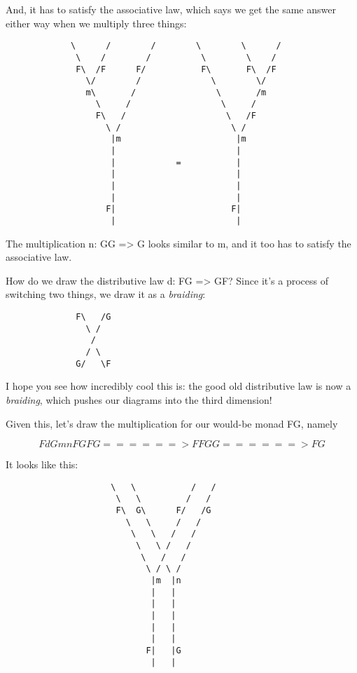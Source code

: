 And, it has to satisfy the associative law, which says we
get the same answer either way when we multiply three things:

\begin{verbatim}
             \      /        /        \        \      /
              \    /        /          \        \    /
              F\  /F      F/           F\       F\  /F
                \/        /              \        \/
                m\       /                \       /m 
                  \     /                  \     /
                  F\   /                    \   /F
                    \ /                      \ /
                     |m                       |m
                     |                        |
                     |            =           |
                     |                        |
                     |                        |
                     |                        |
                    F|                       F|
                     |                        |
\end{verbatim}
    
The multiplication n: GG => G looks similar to m, and it too has
to satisfy the associative law.   

How do we draw the distributive law d: FG => GF?  Since it's a 
process of switching two things, we draw it as a \emph{braiding}:

\begin{verbatim}
              F\   /G
                \ /
                 / 
                / \
              G/   \F 
\end{verbatim}
    
I hope you see how incredibly cool this is: the good old 
distributive law is now a \emph{braiding}, which pushes our diagrams
into the third dimension!  

Given this, let's draw the multiplication for our would-be
monad FG, namely 

$$
       FdG          mn 
FGFG ======> FFGG ======> FG
$$
    
It looks like this:

\begin{verbatim}
                     \   \           /   /
                      \   \         /   /
                      F\  G\      F/   /G
                        \   \     /   /
                         \   \   /   /
                          \   \ /   /
                           \   /   /
                            \ / \ /
                             |m  |n             
                             |   |
                             |   |
                             |   |
                             |   |
                             |   |
                            F|   |G
                             |   |
\end{verbatim}
    
